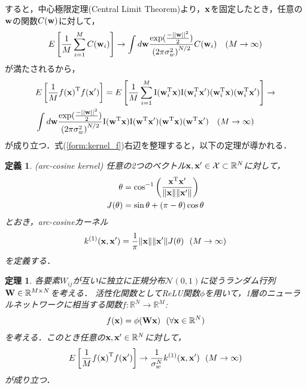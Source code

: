 \documentclass[11pt,a4j]{jarticle}
\newtheorem{dfn}{定義}
\newtheorem{thm}{定理}
\begin{document}
      すると，中心極限定理(Central Limit Theorem)より，${\bf x}$を固定したとき，任意の${\bf w}$の関数$C({\bf w})$に対して，
      \begin{align}
        E\left[ \frac{1}{M} \sum_{i=1}^{M} C({\bf w}_i) \right] \to
        \int d{\bf w} \frac{\exp (\frac{- {|| {\bf w} ||}^2}{2})}{{(2 \pi \sigma_w^2 )}^{N / 2}}
        C({\bf w}_i) ~~~ (M \to \infty)
      \end{align}
      が満たされるから，
      \begin{align}
        &E\left[ \frac{1}{M} {f({\bf x})}^{\mathrm{T}} f({\bf x}') \right] 
        = E\left[ \frac{1}{M} \sum_{i=1}^{M} {\mathrm{I}}( {\bf w}_{i}^{\mathrm{T}} {\bf x} ) {\mathrm{I}}( {\bf w}_{i}^{\mathrm{T}} {\bf x}' ) 
        ( {\bf w}_{i}^{\mathrm{T}} {\bf x} ) ( {\bf w}_{i}^{\mathrm{T}} {\bf x}' ) \right] 
        \to \nonumber \\
        &\int d{\bf w} \frac{\exp (\frac{- {|| {\bf w} ||}^2}{2})}{{(2 \pi \sigma_w^2 )}^{N / 2}}
        {\mathrm{I}}( {\bf w}^{\mathrm{T}} {\bf x} ) {\mathrm{I}}( {\bf w}^{\mathrm{T}} {\bf x}' ) 
        ( {\bf w}^{\mathrm{T}} {\bf x} ) ( {\bf w}^{\mathrm{T}} {\bf x}' ) ~~~ (M \to \infty) \label{form:kernel_f} 
      \end{align}
      が成り立つ．式(\ref{form:kernel_f})右辺を整理すると，以下の定理が導かれる．

      \begin{dfn}
        (arc-cosine kernel)
        任意の2つのベクトル${\bf x}, {\bf x}' \in \mathcal{X} \subset \mathbb{R}^{N}$に対して，
        \begin{align}
          \theta &= {\cos}^{-1} \left( \frac{{\bf x}^{\mathrm{T}} {\bf x}'}{ \|{\bf x}\| \|{\bf x}'\| } \right) \\
          J(\theta) &= \sin \theta + (\pi - \theta) \cos \theta
        \end{align}
        とおき，arc-cosineカーネル
        \begin{align}
          k^{(1)}({\bf x}, {\bf x}') = \frac{1}{\pi} \| {\bf x} \| \| {\bf x}' \| J(\theta) ~~ (M \to \infty)
        \end{align}
        を定義する．
      \end{dfn}

      \begin{thm}\label{thm:clt_dnn}
        各要素$W_{ij}$が互いに独立に正規分布$\mathcal{N}(0, 1)$に従うランダム行列${\bf W} \in \mathbb{R}^{M \times N}$を考える．
        活性化関数としてReLU関数$\phi$を用いて，1層のニューラルネットワークに相当する関数$f:\mathbb{R}^{N} \to \mathbb{R}^{M}$:
        \begin{align}
          f({\bf x}) = \phi({\bf Wx}) ~~ (\forall {\bf x} \in \mathbb{R}^{N})
        \end{align}
        を考える．このとき任意の${\bf x}, {\bf x}' \in \mathbb{R}^{N}$に対して，
        \begin{align}
          E \left[ \frac{1}{M} {f({\bf x})}^{\mathrm{T}} f({\bf x}') \right] \to
          \frac{1}{\sigma_w^N} k^{(1)}({\bf x}, {\bf x}') ~~ (M \to \infty)
        \end{align}
        が成り立つ．
      \end{thm}
\end{document}
